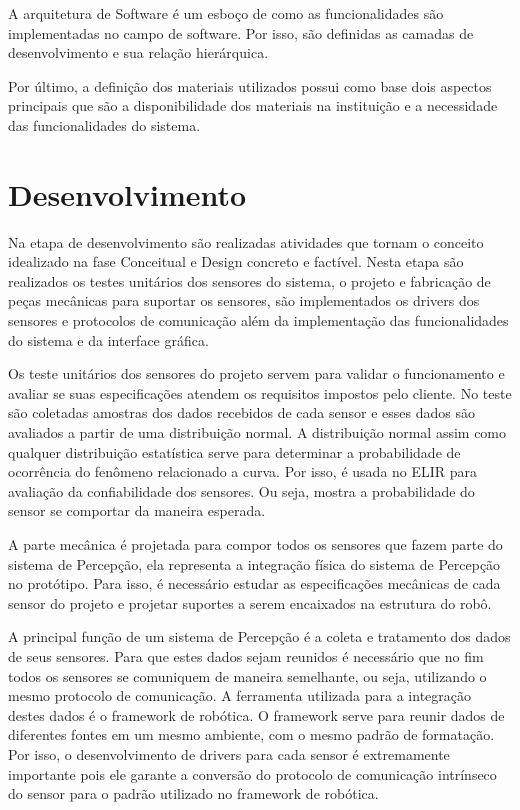 A arquitetura de Software é um esboço de como as funcionalidades são implementadas no campo de software. Por isso, são definidas as camadas de desenvolvimento e sua relação hierárquica. 

Por último, a definição dos materiais utilizados possui como base dois aspectos principais que são a disponibilidade dos materiais na instituição e a necessidade das funcionalidades do sistema. 


\section{Desenvolvimento}
Na etapa de desenvolvimento são realizadas atividades que tornam o conceito idealizado na fase Conceitual e Design  concreto e factível. Nesta etapa são realizados os testes unitários dos sensores do sistema, o projeto  e fabricação de peças mecânicas para suportar os sensores, são implementados os drivers dos sensores e protocolos de comunicação além da implementação das funcionalidades do sistema e da interface gráfica. 

Os teste unitários dos  sensores do projeto servem para validar o funcionamento e avaliar se suas especificações atendem os requisitos impostos pelo cliente. No teste são coletadas amostras dos dados recebidos de cada sensor e esses dados são avaliados a partir de uma distribuição normal. A distribuição normal assim como qualquer distribuição estatística serve para determinar a probabilidade de ocorrência do fenômeno relacionado a curva. Por isso, é usada no ELIR para avaliação da confiabilidade dos sensores. Ou seja, mostra a probabilidade do sensor se comportar da maneira esperada.

A parte mecânica é projetada para compor todos os sensores que fazem parte do sistema de Percepção, ela representa a integração física do sistema de Percepção no protótipo. Para isso, é necessário estudar as especificações mecânicas de cada sensor do projeto e projetar suportes a serem encaixados na estrutura do robô.

A principal função de um sistema de Percepção é a coleta e tratamento dos dados de seus sensores. Para que estes dados sejam reunidos é necessário que no fim todos os sensores se comuniquem de maneira semelhante, ou seja, utilizando o mesmo protocolo de comunicação. A ferramenta utilizada para a integração destes dados é o framework de robótica. O framework serve para reunir dados de diferentes fontes em um mesmo ambiente, com o mesmo padrão de formatação. Por isso, o desenvolvimento de drivers para cada sensor é extremamente importante pois ele garante a conversão do protocolo de comunicação intrínseco do sensor para o padrão utilizado no framework de robótica.


